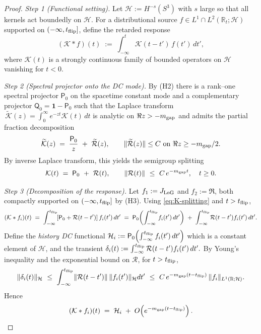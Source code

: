 \documentclass[10pt]{article}
\theoremstyle{definition}
\theoremstyle{plain}
\begin{document}
\begin{proof}
\emph{Step 1 (Functional setting).} Let $\mathcal H:=H^{-s}(S^3)$ with $s$ large so that all kernels act boundedly on $\mathcal H$. For a distributional source $f\in L^1\cap L^2(\mathbb R_t;\mathcal H)$ supported on $(-\infty,t_{\rm flip}]$, define the retarded response
\[
(\mathcal K * f)(t)\;:=\;\int_{-\infty}^t\! \mathcal K(t-t')\,f(t')\,dt',
\]
where $\mathcal K(t)$ is a strongly continuous family of bounded operators on $\mathcal H$ vanishing for $t<0$.

\emph{Step 2 (Spectral projector onto the DC mode).} By (H2) there is a rank–one spectral projector $\mathsf P_0$ on the spacetime constant mode and a complementary projector $\mathsf Q_0=\mathbf 1-\mathsf P_0$ such that the Laplace transform $\,\widetilde{\mathcal K}(z)=\int_0^\infty e^{-zt}\mathcal K(t)\,dt$ is analytic on $\Re z>-m_{\rm gap}$ and admits the partial fraction decomposition
\[
\widetilde{\mathcal K}(z)\;=\;\frac{\mathsf P_0}{z}\ +\ \widetilde{\mathcal R}(z),\qquad \|\widetilde{\mathcal R}(z)\|\le C\ \text{on }\Re z\ge -m_{\rm gap}/2.
\]
By inverse Laplace transform, this yields the semigroup splitting
\begin{equation}
\mathcal K(t)\;=\;\mathsf P_0\ +\ \mathcal R(t),\qquad \|\mathcal R(t)\|\ \le\ C\,e^{-m_{\rm gap} t},\quad t\ge 0.
\label{eq:K-splitting}
\end{equation}

\emph{Step 3 (Decomposition of the response).} Let $f_1:=J_{\rm LoG}$ and $f_2:=\mathfrak R$, both compactly supported on $(-\infty,t_{\rm flip}]$ by (H3). Using \eqref{eq:K-splitting} and $t>t_{\rm flip}$,
\[
(\mathcal K * f_i)(t)\;=\;\int_{-\infty}^{t_{\rm flip}}\!\!\left[\mathsf P_0+\mathcal R(t-t')\right] f_i(t')\,dt'
\;=\;\mathsf P_0\!\left(\int_{-\infty}^{t_{\rm flip}}\! f_i(t')\,dt'\right)\;+\;\int_{-\infty}^{t_{\rm flip}}\!\mathcal R(t-t') f_i(t')\,dt'.
\]
Define the \emph{history DC} functional 
\(
\mathcal H_i:=\mathsf P_0\!\left(\int_{-\infty}^{t_{\rm flip}} f_i(t')\,dt'\right)
\)
which is a constant element of $\mathcal H$, and the transient
\(
\delta_i(t):=\int_{-\infty}^{t_{\rm flip}}\mathcal R(t-t') f_i(t')\,dt'.
\)
By Young’s inequality and the exponential bound on $\mathcal R$, for $t>t_{\rm flip}$,
\[
\|\delta_i(t)\|_{\mathcal H}
\ \le\ \int_{-\infty}^{t_{\rm flip}}\! \|\mathcal R(t-t')\|\,\|f_i(t')\|_{\mathcal H} dt'
\ \le\ C\,e^{-m_{\rm gap}(t-t_{\rm flip})}\,\|f_i\|_{L^1(\mathbb R;\mathcal H)}.
\]
Hence 
\[
(\mathcal K * f_i)(t)\;=\;\mathcal H_i\;+\;O\!\left(e^{-m_{\rm gap}(t-t_{\rm flip})}\right).
\]


\end{proof}
\end{document}

